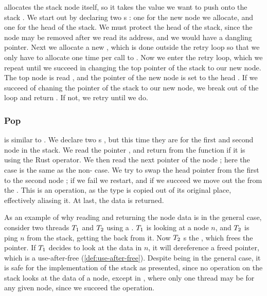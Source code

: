  allocates the stack node itself, so it takes the value we want to push onto the stack
. We start out by declaring two s : one for the new node we
allocate, and one for the head of the stack. We must protect the head of the stack, since the node
may be removed after we read its address, and we would have a dangling pointer.  Next we allocate a
new  , which is done outside the retry loop so that we only have to
allocate one time per call to . Now we enter the retry loop, which we repeat until we
succeed in changing the top pointer of the stack to our new node.
The top node is read , and the  pointer of the new node is set to the head
. If we succeed of chaning the   pointer of the stack to our new node, we
break out of the loop and return . If not, we retry until we do.


\subsubsection{Pop}

 is similar to . We declare two s , but this time
they are for the first and second node in the stack. We read the  pointer ,
and return from the function if it is  using the  Rust operator. We then read
the next pointer of the node ; here the  case is the same as the
non- case. We try to swap the head pointer from the first to the second node
; if we fail we restart, and if we succeed we move out the  from the
. This is an  operation, as the type is copied out of its original place,
effectively aliasing it. At last, the data is returned.

As an example of why reading and returning the node data is  in the general case,
consider two threads $T\sb{1}$ and $T\sb{2}$ using a . $T\sb{1}$ is looking at
a node $n$, and $T\sb{2}$ is ping $n$ from the stack, getting the  back from
it. Now $T\sb{2}$ s the , which frees the pointer. If $T\sb{1}$ decides to
look at the data in $n$, it will dereference a freed pointer, which is a use-after-free
(\cref{def:use-after-free}). Despite being  in the general case, it is safe for the
implementation of the stack as presented, since no operation on the stack looks at the data of a
node, except in , where only one thread may be for any given node, since we succeed
the  operation.




